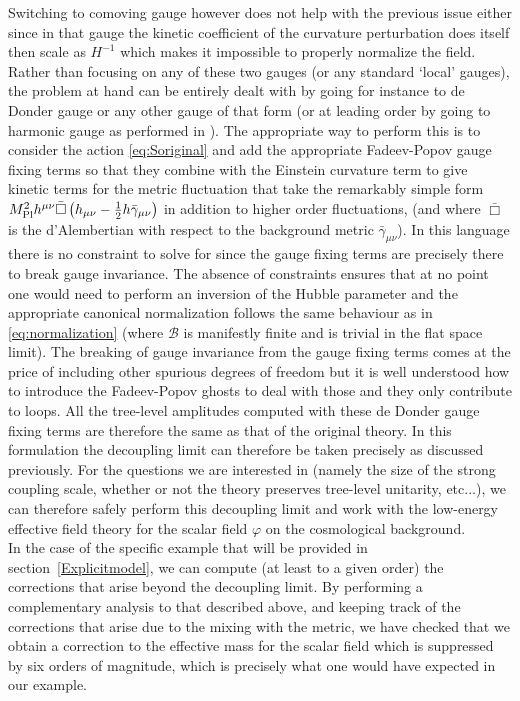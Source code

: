 \documentclass[12pt]{article}
\def\mpl{M_{\rm Pl}}
\def\({\left(}
\def\){\right)}
\def\mn{_{\mu \nu}}
\begin{document}
Switching to comoving gauge however does not help with the previous issue either since in that gauge the kinetic coefficient of the curvature perturbation does itself then scale as $H^{-1}$ which makes it impossible to properly normalize the field. Rather than focusing on any of these two gauges (or any standard `local' gauges), the problem at hand can be entirely dealt with by going for instance to de Donder gauge or any other gauge of that form (or at leading order by going to harmonic gauge as performed in \cite{Battarra:2014tga}). The appropriate way to perform this is to consider the action \eqref{eq:Soriginal} and add the appropriate Fadeev-Popov gauge fixing terms so that they combine with the  Einstein curvature term to give kinetic terms for the metric fluctuation that take the remarkably simple form $\mpl^2 h^{\mu \nu} \bar \Box \(h\mn -\frac 12 h \bar \gamma\mn\)$ in addition to higher order fluctuations, (and where $\bar \Box $ is the d'Alembertian with respect to the background metric $\bar \gamma\mn$).  In this language there is no constraint to solve for since the gauge fixing terms are precisely there to break gauge invariance. The absence of constraints ensures that at no point one would need to perform an inversion of the Hubble parameter and  the appropriate canonical normalization follows the same behaviour as in \eqref{eq:normalization} (where $\mathcal{B}$ is manifestly finite and is trivial in the flat space limit). The breaking of gauge invariance from the gauge fixing terms comes at the price of including other spurious degrees of freedom  but it is well understood how to introduce the  Fadeev-Popov ghosts to deal with those and they only contribute to loops. All the tree-level amplitudes computed with  these de Donder gauge fixing terms are therefore the same as that of the original theory. In this formulation the decoupling limit can therefore be taken precisely as discussed previously. For the questions we are interested in (namely the size of the strong coupling scale, whether or not the theory preserves tree-level unitarity, etc...), we can therefore safely perform this decoupling limit and work with the low-energy effective field theory for the scalar field $\varphi$ on the cosmological background. \\

In the case of the specific example that will be provided in section~\ref{Explicitmodel}, we can compute (at least to a given order) the corrections that arise beyond  the decoupling limit. By performing a complementary  analysis to that described above, and keeping track of the corrections that arise due to the mixing with the metric, we have checked that we obtain a correction to the effective mass for the scalar field which is suppressed by six orders of magnitude, which is precisely what one would have expected in our example.
\end{document}
